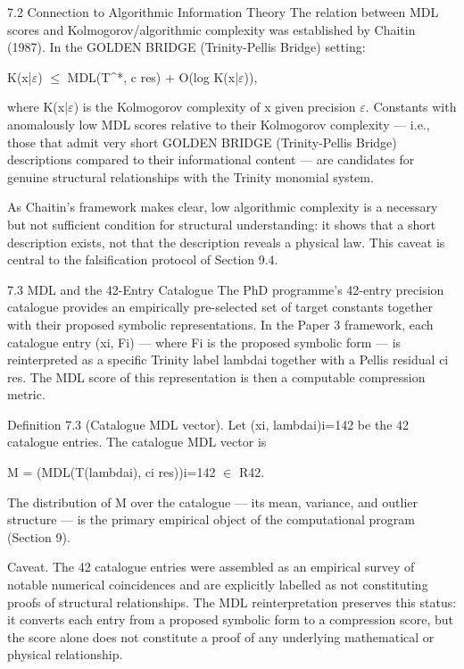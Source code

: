   7.2 Connection to Algorithmic Information Theory
  The relation between MDL scores and Kolmogorov/algorithmic complexity was
  established by Chaitin (1987). In the GOLDEN BRIDGE (Trinity-Pellis Bridge) setting:

  K(x|$\varepsilon$) $\leq$ MDL(T\textasciicircum{}*, c res) + O(log K(x|$\varepsilon$)),

  where K(x|$\varepsilon$) is the Kolmogorov complexity of x given precision $\varepsilon$. Constants with
  anomalously low MDL scores relative to their Kolmogorov complexity --- i.e., those that
  admit very short GOLDEN BRIDGE (Trinity-Pellis Bridge) descriptions compared to their informational content ---
  are candidates for genuine structural relationships with the Trinity monomial system.

  As Chaitin's framework makes clear, low algorithmic complexity is a necessary but not
  sufficient condition for structural understanding: it shows that a short description
  exists, not that the description reveals a physical law. This caveat is central to the
  falsification protocol of Section 9.4.

  7.3 MDL and the 42-Entry Catalogue
  The PhD programme's 42-entry precision catalogue provides an empirically
  pre-selected set of target constants together with their proposed symbolic
  representations. In the Paper 3 framework, each catalogue entry (xi, Fi) --- where Fi is
  the proposed symbolic form --- is reinterpreted as a specific Trinity label lambdai
  together with a Pellis residual ci res. The MDL score of this representation is then a
  computable compression metric.

        Definition 7.3 (Catalogue MDL vector). Let {(xi, lambdai)}i=142 be the 42
        catalogue entries. The catalogue MDL vector is

  M = (MDL(T(lambdai), ci res))i=142 $\in$ R42.

  The distribution of M over the catalogue --- its mean, variance, and outlier structure ---
  is the primary empirical object of the computational program (Section 9).

  Caveat. The 42 catalogue entries were assembled as an empirical survey of notable
  numerical coincidences and are explicitly labelled as not constituting proofs of
  structural relationships. The MDL reinterpretation preserves this status: it converts
  each entry from a proposed symbolic form to a compression score, but the score alone
  does not constitute a proof of any underlying mathematical or physical relationship.

